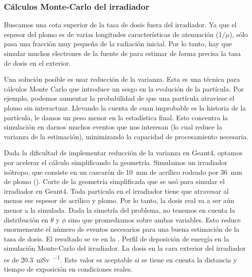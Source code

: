 \subsubsection{Cálculos Monte-Carlo del irradiador}
Buscamos una cota superior de la tasa de dosis fuera del irradiador.
Ya que el espesor del plomo es de varias longitudes características de
atenuación ($1/\mu$),
sólo pasa una fracción muy pequeña de la radiación inicial.
Por lo tanto, hay que simular muchos electrones de la fuente de \Strontium
para estimar de forma precisa la tasa de dosis en el exterior.

Una solución posible es usar reducción de la
varianza\cite{dressel_geometrical_2003}.
Esta es una técnica para cálculos Monte Carlo que introduce un sesgo en la
evolución de la partícula.
Por ejemplo, podemos aumentar la probabilidad de que una partícula atraviese
el plomo sin interactuar.
Llevando la cuenta de cuan improbable es la historia de la partícula,
le damos un peso menor en la estadística final.
Esto concentra la simulación en darnos muchos eventos que nos interesan
(lo cual reduce la varianza de la estimación),
minimizando la capacidad de procesamiento necesaria.

Dada la dificultad de implementar reducción de la varianza en Geant4,
optamos por acelerar el cálculo simplificando la geometría.
Simulamos un irradiador isótropo,
que consiste en un cascarón de \SI{10}{\milli\meter} de acrílico rodeado por
\SI{36}{\milli\meter} de plomo (). 
{Corte de la geometría simplificada que se usó para simular el irradiador en
Geant4.}
Toda partícula en el irradiador tiene que atravesar al menos ese espesor de
acrílico y plomo.
Por lo tanto, la dosis real va a ser aún menor a la simulada.
Dada la simetría del problema, no tenemos en cuenta la distribución en
$\theta$ y $\phi$ sino que promediamos sobre ambas variables.
Esto reduce enormemente el número de eventos necesarios para una buena
estimación de la tasa de dosis.
El resultado se ve en la .
{Perfil de deposición de energía en la simulación Monte-Carlo del irradiador.}
La dosis en la cara exterior del irradiador es de
\SI{20.3}{\milli\sievert\per\year}.
Este valor es aceptable si se tiene en cuenta la distancia y tiempo de
exposición en condiciones reales.
